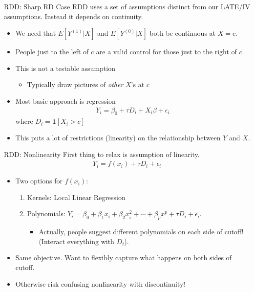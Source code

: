 \begin{frame}{RDD: Sharp RD Case}
RDD uses a set of assumptions distinct from our LATE/IV assumptions. Instead it depends on \alert{continuity}.
\begin{itemize}
\item We need that $E[Y^{(1)} | X]$ and $E[Y^{(0)} | X]$ both be continuous at $X=c$.
\item People just to the left of $c$ are a valid control for those just to the right of $c$.
\item \alert{This is not a testable assumption} 
  \begin{itemize}
    \item Typically draw pictures of \textit{other} $X$'s at $c$
  \end{itemize}
\item Most basic approach is regression
\begin{eqnarray*}
Y_i = \beta_0 + \tau D_i + X_i \beta + \epsilon_i
\end{eqnarray*} where $D_i = \mathbf{1}[X_i > c]$
\item This puts a lot of restrictions (linearity) on the relationship between $Y$ and $X$.
\end{itemize}
\end{frame}


\begin{frame}{RDD: Nonlinearity}
First thing to relax is assumption of linearity.
\begin{eqnarray*}
Y_i = f(x_i) + \tau D_i  + \epsilon_i
\end{eqnarray*}
\begin{itemize}
\item Two options for $f(x_i)$:
\begin{enumerate}
\item Kernels: Local Linear Regression
\item Polynomials: $Y_i = \beta_0 + \beta_1 x_i + \beta_2 x_i^2 + \cdots + \beta_p x^p + \tau D_i + \epsilon_i$.
\begin{itemize}
\item Actually, people suggest different polynomials on each side of cutoff! (Interact everything with $D_i$).
\end{itemize}
\end{enumerate}
\item Same objective. Want to flexibly capture what happens on both sides of cutoff.
\item Otherwise risk confusing nonlinearity with discontinuity!
\end{itemize}
\end{frame}
	
